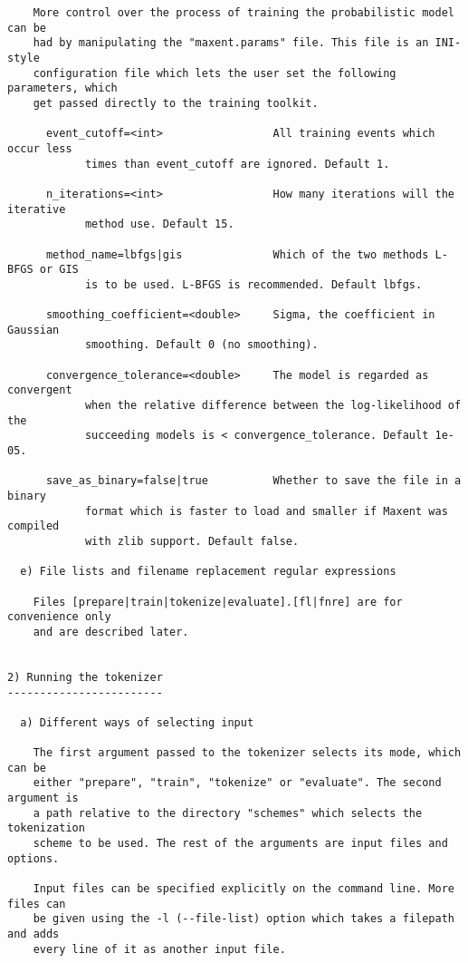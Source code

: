 \begin{small}
\begin{verbatim}
    More control over the process of training the probabilistic model can be
    had by manipulating the "maxent.params" file. This file is an INI-style
    configuration file which lets the user set the following parameters, which
    get passed directly to the training toolkit.

      event_cutoff=<int>                 All training events which occur less
            times than event_cutoff are ignored. Default 1.

      n_iterations=<int>                 How many iterations will the iterative
            method use. Default 15.

      method_name=lbfgs|gis              Which of the two methods L-BFGS or GIS
            is to be used. L-BFGS is recommended. Default lbfgs.

      smoothing_coefficient=<double>     Sigma, the coefficient in Gaussian
            smoothing. Default 0 (no smoothing).

      convergence_tolerance=<double>     The model is regarded as convergent
            when the relative difference between the log-likelihood of the
            succeeding models is < convergence_tolerance. Default 1e-05.

      save_as_binary=false|true          Whether to save the file in a binary
            format which is faster to load and smaller if Maxent was compiled
            with zlib support. Default false.

  e) File lists and filename replacement regular expressions

    Files [prepare|train|tokenize|evaluate].[fl|fnre] are for convenience only
    and are described later.
 

2) Running the tokenizer
------------------------

  a) Different ways of selecting input

    The first argument passed to the tokenizer selects its mode, which can be
    either "prepare", "train", "tokenize" or "evaluate". The second argument is
    a path relative to the directory "schemes" which selects the tokenization
    scheme to be used. The rest of the arguments are input files and options.

    Input files can be specified explicitly on the command line. More files can
    be given using the -l (--file-list) option which takes a filepath and adds
    every line of it as another input file.


\end{verbatim}
\end{small}
